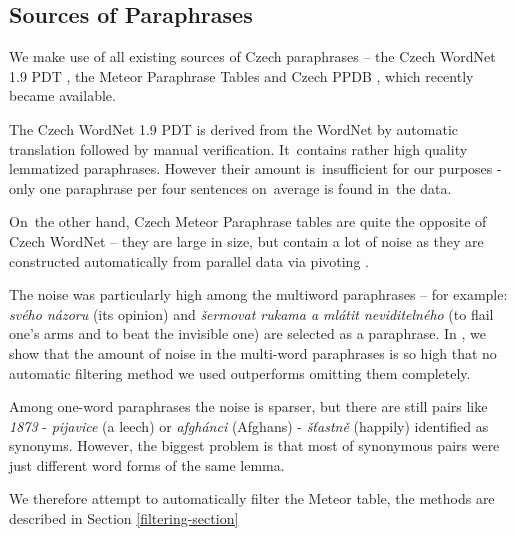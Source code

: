 \documentclass[11pt]{article}
\def\Tref#1{Table~\ref{#1}}
\begin{document}
\subsection{Sources of Paraphrases}
We make use of all existing sources of Czech paraphrases -- the Czech WordNet 1.9 PDT 
\cite{czech-wordnet}, the Meteor Paraphrase Tables \cite{meteor-tables} and Czech PPDB %
, which recently became available.

The Czech WordNet 1.9 PDT is derived from the WordNet \cite{wordnet} by automatic translation 
followed by manual verification. It~contains rather high quality lemmatized paraphrases. However 
their amount is~insufficient for our purposes %
- only one paraphrase per four sentences on~average is found in~the data. %

On~the other hand, Czech Meteor Paraphrase tables are quite the opposite of Czech WordNet -- 
they are large in size, but contain a lot of noise as they are constructed automatically 
from parallel data via pivoting \cite{pivoting}. 

The noise was particularly high among the multiword paraphrases -- for example: \textit{svého názoru} 
(its opinion) and \textit{šermovat rukama a mlátit neviditelného} (to flail one's arms and to beat 
the invisible one) are selected as a paraphrase. In , we show that the amount 
of noise in the multi-word paraphrases is so high that no automatic filtering method we used outperforms 
omitting them completely.

Among one-word paraphrases the noise is sparser, but there are still pairs like \textit{1873} - 
\textit{pijavice} (a leech) or \textit{afgh\'{a}nci} (Afghans) - \textit{š\v{t}astně} (happily) 
identified as synonyms. However, the biggest problem is that most of synonymous pairs were just 
different word forms of the same lemma. 

We therefore attempt to automatically filter the Meteor table, the methods are described in Section 
\ref{filtering-section}


\end{document}
